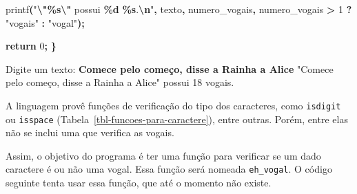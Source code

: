 \documentclass[
  11pt,
  a4paper,
]{scrbook}
\newenvironment{Shaded}{\begin{snugshade}}{\end{snugshade}}
\newcommand{\ControlFlowTok}[1]{\textcolor[rgb]{0.13,0.29,0.53}{\textbf{#1}}}
\newcommand{\DecValTok}[1]{\textcolor[rgb]{0.00,0.00,0.81}{#1}}
\newcommand{\KeywordTok}[1]{\textcolor[rgb]{0.13,0.29,0.53}{\textbf{#1}}}
\newcommand{\NormalTok}[1]{#1}
\newcommand{\OperatorTok}[1]{\textcolor[rgb]{0.81,0.36,0.00}{\textbf{#1}}}
\newcommand{\SpecialCharTok}[1]{\textcolor[rgb]{0.81,0.36,0.00}{\textbf{#1}}}
\newcommand{\StringTok}[1]{\textcolor[rgb]{0.31,0.60,0.02}{#1}}
\begin{document}
\begin{Shaded}
\begin{Highlighting}[]
\NormalTok{    printf}\OperatorTok{(}\StringTok{"}\SpecialCharTok{\textbackslash{}"\%s\textbackslash{}"}\StringTok{ possui }\SpecialCharTok{\%d}\StringTok{ }\SpecialCharTok{\%s}\StringTok{.}\SpecialCharTok{\textbackslash{}n}\StringTok{"}\OperatorTok{,}\NormalTok{ texto}\OperatorTok{,}\NormalTok{ numero\_vogais}\OperatorTok{,}
\NormalTok{           numero\_vogais }\OperatorTok{\textgreater{}} \DecValTok{1} \OperatorTok{?} \StringTok{"vogais"} \OperatorTok{:} \StringTok{"vogal"}\OperatorTok{);}

    \ControlFlowTok{return} \DecValTok{0}\OperatorTok{;}
\OperatorTok{\}}
\end{Highlighting}
\end{Shaded}

\begin{Shaded}
\begin{Highlighting}[]
\NormalTok{Digite um texto: }\KeywordTok{ Comece pelo começo, disse a Rainha a Alice }
\NormalTok{"Comece pelo começo, disse a Rainha a Alice" possui 18 vogais.}
\end{Highlighting}
\end{Shaded}

A linguagem provê funções de verificação do tipo dos caracteres, como
\texttt{isdigit} ou \texttt{isspace}
(Tabela~\ref{tbl-funcoes-para-caractere}), entre outras. Porém, entre
elas não se inclui uma que verifica as vogais.

Assim, o objetivo do programa é ter uma função para verificar se um dado
caractere é ou não uma vogal. Essa função será nomeada
\texttt{eh\_vogal}. O código seguinte tenta usar essa função, que até o
momento não existe.
\end{document}
